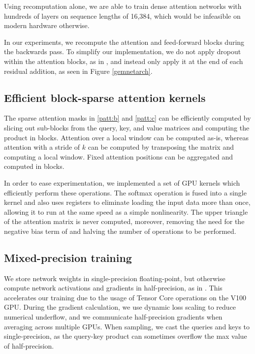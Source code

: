 \documentclass{article}
\begin{document}
Using recomputation alone, we are able to train dense attention networks with hundreds of layers on sequence lengths of 16,384, which would be infeasible on modern hardware otherwise.

In our experiments, we recompute the attention and feed-forward blocks during the backwards pass. To simplify our implementation, we do not apply dropout within the attention blocks, as in \cite{vaswani2017attention}, and instead only apply it at the end of each residual addition, as seen in Figure \ref{gemnetarch}.

\subsection{Efficient block-sparse attention kernels}
The sparse attention masks in \ref{patt:b} and \ref{patt:c} can be efficiently computed by slicing out sub-blocks from the query, key, and value matrices and computing the product in blocks. Attention over a local window can be computed as-is, whereas attention with a stride of $k$ can be computed by transposing the matrix and computing a local window. Fixed attention positions can be aggregated and computed in blocks.

In order to ease experimentation, we implemented a set of GPU kernels which efficiently perform these operations. The softmax operation is fused into a single kernel and also uses registers to eliminate loading the input data more than once, allowing it to run at the same speed as a simple nonlinearity. The upper triangle of the attention matrix is never computed, moreover, removing the need for the negative bias term of \cite{vaswani2017attention} and halving the number of operations to be performed.

\subsection{Mixed-precision training}
We store network weights in single-precision floating-point, but otherwise compute network activations and gradients in half-precision, as in \cite{micikevicius2017mixed}. This accelerates our training due to the usage of Tensor Core operations on the V100 GPU. During the gradient calculation, we use dynamic loss scaling to reduce numerical underflow, and we communicate half-precision gradients when averaging across multiple GPUs. When sampling, we cast the queries and keys to single-precision, as the query-key product can sometimes overflow the max value of half-precision.
\end{document}
